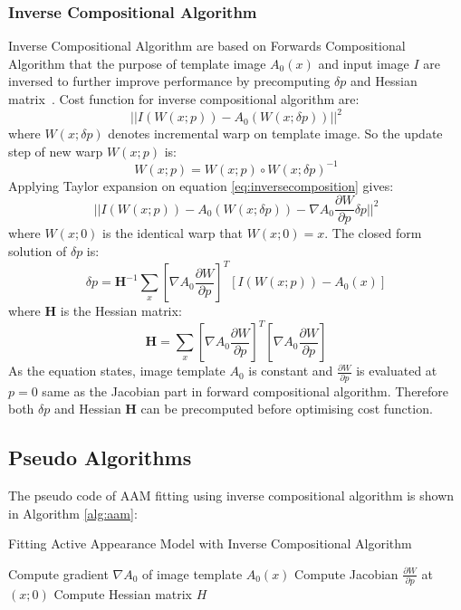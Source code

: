 \subsubsection{Inverse Compositional Algorithm}
Inverse Compositional Algorithm are based on Forwards Compositional Algorithm that the purpose of template image $A_0(x)$ and input image $I$ are inversed to further improve performance by precomputing $\delta p$ and Hessian matrix~\cite{Matthews2004}. Cost function for inverse compositional algorithm are:
\begin{equation}
\label{eq:inversecomposition}
||I(W(x;p))-A_0(W(x;\delta p))||^2
\end{equation}
where $W(x;\delta p)$ denotes incremental warp on template image. So the update step of new warp $W(x;p)$ is:
\begin{equation}
W(x;p) = W(x;p)\circ W(x;\delta p)^{-1}
\end{equation}
Applying Taylor expansion on equation \ref{eq:inversecomposition} gives:
\begin{equation}
\label{eq:inversecompositiontaylor}
||I(W(x;p))-A_0(W(x;\delta p))-\nabla A_0\frac{\partial W}{\partial p}\delta p||^2
\end{equation}
where $W(x;0)$ is the identical warp that $W(x;0) = x$. The closed form solution of $\delta p$ is:
\begin{equation}
\label{eq:dpic}
\delta p=\bm{H}^{-1}\sum_x[\nabla A_0\frac{\partial W}{\partial p}]^T[I(W(x;p))-A_0(x)]
\end{equation}
where $\bm{H}$ is the Hessian matrix:
\begin{equation}
\label{eq:hessianic}
\bm{H}=\sum_x[\nabla A_0\frac{\partial W}{\partial p}]^T[\nabla A_0\frac{\partial W}{\partial p}]
\end{equation}
As the equation states, image template $A_0$ is constant and $\frac{\partial W}{\partial p}$ is evaluated at $p=0$ same as the Jacobian part in forward compositional algorithm. Therefore both $\delta p$ and Hessian $\bm{H}$ can be precomputed before optimising cost function. 

\subsection{Pseudo Algorithms}

The pseudo code of AAM fitting using inverse compositional algorithm is shown in Algorithm \ref{alg:aam}\cite{Matthews2004}:

\begin{algorithm}[ht]
\caption{Fitting Active Appearance Model with Inverse Compositional Algorithm}
\label{alg:aam}
Compute gradient $\nabla A_0$ of image template $A_0(x)$\;
Compute Jacobian $\frac{\partial W}{\partial p}$ at $(x;0)$\;
Compute Hessian matrix $H$\;
\end{algorithm}


